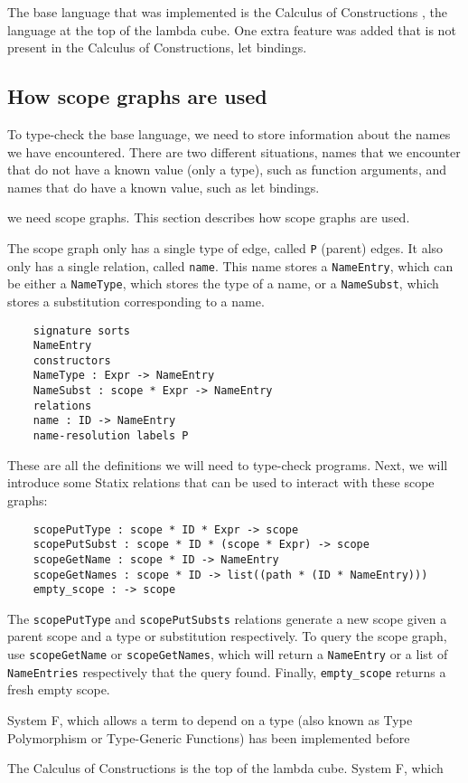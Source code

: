 \documentclass[a4paper,UKenglish,cleveref, autoref, thm-restate]{oasics-v2021}
\begin{document}
The base language that was implemented is the Calculus of Constructions \cite{Coquand_Huet_1988}, the language at the top of the lambda cube. One extra feature was added that is not present in the Calculus of Constructions, let bindings.

\subsection{How scope graphs are used}

To type-check the base language, we need to store information about the names we have encountered. There are two different situations, names that we encounter that do not have a known value (only a type), such as function arguments, and names that do have a known value, such as let bindings. 


   we need scope graphs. This section describes how scope graphs are used.

The scope graph only has a single type of edge, called \verb|P| (parent) edges. It also only has a single relation, called \verb|name|. This name stores a \verb|NameEntry|, which can be either a \verb|NameType|, which stores the type of a name, or a \verb|NameSubst|, which stores a substitution corresponding to a name. 

\begin{lstlisting}
	signature sorts
	NameEntry
	constructors
	NameType : Expr -> NameEntry
	NameSubst : scope * Expr -> NameEntry
	relations
	name : ID -> NameEntry
	name-resolution	labels P
\end{lstlisting}

These are all the definitions we will need to type-check programs. Next, we will introduce some Statix relations that can be used to interact with these scope graphs:

\begin{lstlisting}
	scopePutType : scope * ID * Expr -> scope
	scopePutSubst : scope * ID * (scope * Expr) -> scope
	scopeGetName : scope * ID -> NameEntry
	scopeGetNames : scope * ID -> list((path * (ID * NameEntry)))
	empty_scope : -> scope
\end{lstlisting}

The \verb|scopePutType| and \verb|scopePutSubsts| relations generate a new scope given a parent scope and a type or substitution respectively. To query the scope graph, use \verb|scopeGetName| or \verb|scopeGetNames|, which will return a \verb|NameEntry| or a list of \verb|NameEntries| respectively that the query found. Finally, \verb|empty_scope| returns a fresh empty scope.


System F, which allows a term to depend on a type (also known as Type Polymorphism or Type-Generic Functions)  has been implemented before 

The Calculus of Constructions is the top of the lambda cube. System F, which 



\end{document}
